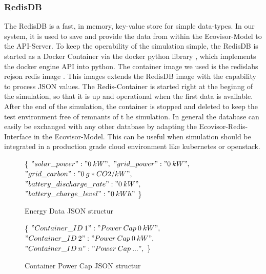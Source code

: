 \subsubsection{RedisDB}
The RedisDB is a fast, in memory, key-value store for simple data-types. In our system, it is used to save and provide the data from within the Ecovisor-Model to the API-Server. To keep the operability of the simulation simple, the RedisDB is started as a Docker Container via the docker python library \cite{docker_python}, which implements the docker engine API into python. The container image we used is the redislabs rejson redis image \cite{RedisJSON}. This images extends the RedisDB image with the capability to process JSON values. The Redis-Container is started right at the beginng of the simulation, so that it is up and operational when the first data is available. After the end of the simulation, the container is stopped and deleted to keep the test environment free of remnants of t he simulation. 
In general the database can easily be exchanged with any other database by adapting the Ecovisor-Redis-Interface in the Ecovisor-Model. This can be useful when simulation should be integrated
in a production grade cloud environment like kubernetes or openstack.






\begin{figure}
	\removelatexerror
	\begin{algorithm}[H]
		\caption{Energy Data JSON structur}
		\label{alg:energy_JSON}
		\{\;
			$"solar\_power" : "0\: kW",$\;
			$"grid\_power" : "0\: kW",$\;
			$"grid\_carbon" : "0\: g*CO2/kW",$\;
			$"battery\_discharge\_rate" : "0\: kW",$\;
			$"battery\_charge\_level" : "0\: kWh"$\;
		\}
		\vspace{3mm}
	\end{algorithm}
\end{figure}

\begin{figure}
	\removelatexerror
	\begin{algorithm}[H]
		\caption{Container Power Cap JSON structur}
		\label{alg:container_JSON}
		\{\;
		$"Container\_ID\: 1" : "Power\: Cap\: 0\: kW",$\;
		$"Container\_ID\: 2" : "Power\: Cap\: 0\: kW",$\;
		$"Container\_ID\: n" : "Power\: Cap\: ...",$\;
		\}
		\vspace{3mm}
	\end{algorithm}
\end{figure}

